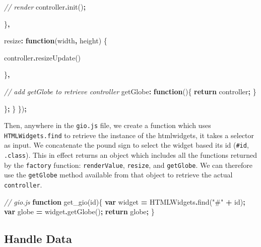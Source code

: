 \documentclass[
]{krantz}
\makeatletter
\newenvironment{Shaded}{\begin{snugshade}}{\end{snugshade}}
\newcommand{\CommentTok}[1]{\textcolor[rgb]{0.37,0.37,0.37}{\textit{#1}}}
\newcommand{\ControlFlowTok}[1]{\textcolor[rgb]{0.27,0.27,0.27}{\textbf{#1}}}
\newcommand{\DataTypeTok}[1]{\textcolor[rgb]{0.27,0.27,0.27}{#1}}
\newcommand{\FunctionTok}[1]{\textcolor[rgb]{0,0,0}{#1}}
\newcommand{\KeywordTok}[1]{\textcolor[rgb]{0.27,0.27,0.27}{\textbf{#1}}}
\newcommand{\NormalTok}[1]{#1}
\newcommand{\OperatorTok}[1]{\textcolor[rgb]{0.43,0.43,0.43}{\textbf{#1}}}
\newcommand{\StringTok}[1]{\textcolor[rgb]{0.5,0.5,0.5}{#1}}
\newenvironment{kframe}{%
\medskip{}
\setlength{\fboxsep}{.8em}
 \def\at@end@of@kframe{}%
 \ifinner\ifhmode%
  \def\at@end@of@kframe{\end{minipage}}%
  \begin{minipage}{\columnwidth}%
 \fi\fi%
 \def\FrameCommand##1{\hskip\@totalleftmargin \hskip-\fboxsep
 \colorbox{shadecolor}{##1}\hskip-\fboxsep
     \hskip-\linewidth \hskip-\@totalleftmargin \hskip\columnwidth}%
 \MakeFramed {\advance\hsize-\width
   \@totalleftmargin\z@ \linewidth\hsize
   \@setminipage}}%
 {\par\unskip\endMakeFramed%
 \at@end@of@kframe}
\renewenvironment{Shaded}{\begin{kframe}}{\end{kframe}}
\makeatother
\begin{document}
\begin{Shaded}
\begin{Highlighting}[]
        \CommentTok{// render}
\NormalTok{        controller}\OperatorTok{.}\FunctionTok{init}\NormalTok{()}\OperatorTok{;}

\NormalTok{      \}}\OperatorTok{,}

      \DataTypeTok{resize}\OperatorTok{:} \KeywordTok{function}\NormalTok{(width}\OperatorTok{,}\NormalTok{ height) \{}

\NormalTok{        controller}\OperatorTok{.}\FunctionTok{resizeUpdate}\NormalTok{()}

\NormalTok{      \}}\OperatorTok{,}

      \CommentTok{// add getGlobe to retrieve controller}
      \DataTypeTok{getGlobe}\OperatorTok{:} \KeywordTok{function}\NormalTok{()\{}
        \ControlFlowTok{return}\NormalTok{ controller}\OperatorTok{;}
\NormalTok{      \}}

\NormalTok{    \}}\OperatorTok{;}
\NormalTok{  \}}
\NormalTok{\})}\OperatorTok{;}
\end{Highlighting}
\end{Shaded}

Then, anywhere in the \texttt{gio.js} file, we create a function which uses \texttt{HTMLWidgets.find} to retrieve the instance of the htmlwidgets, it takes a selector as input. We concatenate the pound sign to select the widget based its id (\texttt{\#id}, \texttt{.class}). This in effect returns an object which includes all the functions returned by the \texttt{factory} function: \texttt{renderValue}, \texttt{resize}, and \texttt{getGlobe}. We can therefore use the \texttt{getGlobe} method available from that object to retrieve the actual \texttt{controller}.

\begin{Shaded}
\begin{Highlighting}[]
\CommentTok{// gio.js}
\KeywordTok{function} \FunctionTok{get\_gio}\NormalTok{(id)\{}
  \KeywordTok{var}\NormalTok{ widget }\OperatorTok{=}\NormalTok{ HTMLWidgets}\OperatorTok{.}\FunctionTok{find}\NormalTok{(}\StringTok{"\#"} \OperatorTok{+}\NormalTok{ id)}\OperatorTok{;}
  \KeywordTok{var}\NormalTok{ globe }\OperatorTok{=}\NormalTok{ widget}\OperatorTok{.}\FunctionTok{getGlobe}\NormalTok{()}\OperatorTok{;}
  \ControlFlowTok{return}\NormalTok{ globe}\OperatorTok{;}
\NormalTok{\}}
\end{Highlighting}
\end{Shaded}

\hypertarget{handle-data}{%
\subsection*{Handle Data}\label{handle-data}}
\end{document}

